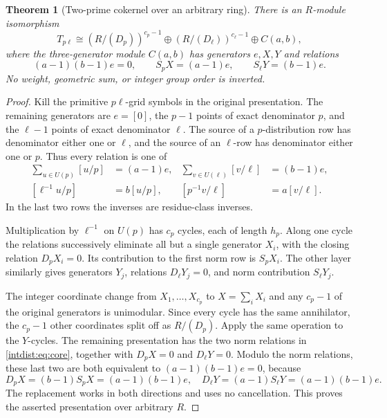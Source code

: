 \documentclass[11pt,a4paper]{article}
\numberwithin{equation}{section}
\theoremstyle{plain}
\newtheorem{theorem}{Theorem}[section]
\theoremstyle{definition}
\theoremstyle{remark}
\begin{document}
\begin{theorem}[Two-prime cokernel over an arbitrary ring]
\label{intdist:thm:two-prime}
There is an $R$-module isomorphism
\begin{equation}\label{intdist:eq:cokernel}
 T_{p\ell}\cong
 (R/(D_p))^{c_p-1}\oplus(R/(D_\ell))^{c_\ell-1}
 \oplus C(a,b),
\end{equation}
where the three-generator module $C(a,b)$ has generators $e,X,Y$ and
relations
\begin{equation}\label{intdist:eq:core}
 (a-1)(b-1)e=0,\qquad
 S_pX=(a-1)e,\qquad
 S_\ell Y=(b-1)e.
\end{equation}
No weight, geometric sum, or integer group order is inverted.
\end{theorem}

\begin{proof}
Kill the primitive $p\ell$-grid symbols in the original presentation.
The remaining generators are $e=[0]$, the $p-1$ points of exact
denominator $p$, and the $\ell-1$ points of exact denominator $\ell$.
The source of a $p$-distribution row has denominator either one or
$\ell$, and the source of an $\ell$-row has denominator either one or
$p$. Thus every relation is one of
\begin{align*}
 \sum_{u\in U(p)}[u/p]&=(a-1)e,&
 \sum_{v\in U(\ell)}[v/\ell]&=(b-1)e,\\
 [\ell^{-1}u/p]&=b[u/p],&
 [p^{-1}v/\ell]&=a[v/\ell].
\end{align*}
In the last two rows the inverses are residue-class inverses.

Multiplication by $\ell^{-1}$ on $U(p)$ has $c_p$ cycles, each of
length $h_p$. Along one cycle the relations successively eliminate
all but a single generator $X_i$, with the closing relation
$D_pX_i=0$. Its contribution to the first norm row is $S_pX_i$.
The other layer similarly gives generators $Y_j$, relations
$D_\ell Y_j=0$, and norm contribution $S_\ell Y_j$.

The integer coordinate change from $X_1,\ldots,X_{c_p}$ to
$X=\sum_iX_i$ and any $c_p-1$ of the original generators is unimodular.
Since every cycle has the same annihilator, the $c_p-1$ other
coordinates split off as $R/(D_p)$. Apply the same operation to the
$Y$-cycles. The remaining presentation has the two norm relations in
\eqref{intdist:eq:core}, together with $D_pX=0$ and $D_\ell Y=0$.
Modulo the norm relations, these last two are both equivalent to
$(a-1)(b-1)e=0$, because
\[
 D_pX=(b-1)S_pX=(a-1)(b-1)e,
 \quad
 D_\ell Y=(a-1)S_\ell Y=(a-1)(b-1)e.
\]
The replacement works in both directions and uses no cancellation.
This proves the asserted presentation over arbitrary $R$.
\end{proof}
\end{document}
